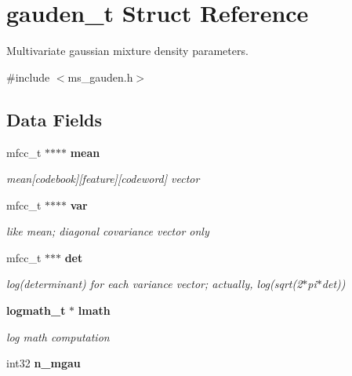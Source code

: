 \section{gauden\-\_\-t Struct Reference}
\label{structgauden__t}


Multivariate gaussian mixture density parameters.  




{\ttfamily \#include $<$ms\-\_\-gauden.\-h$>$}

\subsection*{Data Fields}
\begin{DoxyCompactItemize}
\item 
mfcc\-\_\-t $\ast$$\ast$$\ast$$\ast$ {\bf mean}\label{structgauden__t_aa76d63009601dcb6b99f17db96167f37}

\begin{DoxyCompactList}\small\item\em mean[codebook][feature][codeword] vector \end{DoxyCompactList}\item 
mfcc\-\_\-t $\ast$$\ast$$\ast$$\ast$ {\bf var}\label{structgauden__t_a172cb69c018608ab8c33d54e6f0fdf19}

\begin{DoxyCompactList}\small\item\em like mean; diagonal covariance vector only \end{DoxyCompactList}\item 
mfcc\-\_\-t $\ast$$\ast$$\ast$ {\bf det}\label{structgauden__t_a315918a44ff97b95a6fcdf8739d8089b}

\begin{DoxyCompactList}\small\item\em log(determinant) for each variance vector; actually, log(sqrt(2$\ast$pi$\ast$det)) \end{DoxyCompactList}\item 
{\bf logmath\-\_\-t} $\ast$ {\bf lmath}\label{structgauden__t_ae05c9b82d8a586bea347681ebe04bb83}

\begin{DoxyCompactList}\small\item\em log math computation \end{DoxyCompactList}\item 
int32 {\bf n\-\_\-mgau}\label{structgauden__t_af15df11bd2f3ab0290e0a33ca15c836c}


\end{DoxyCompactItemize}
